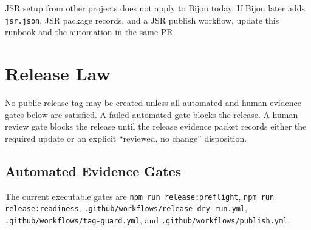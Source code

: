JSR setup from other projects does not apply to Bijou today. If Bijou later adds \texttt{j\allowbreak{}s\allowbreak{}r\allowbreak{}.\allowbreak{}j\allowbreak{}s\allowbreak{}o\allowbreak{}n}, JSR package records, and a JSR publish workflow, update this runbook and the automation in the same PR.

\section{Release Law}\label{record-274-release-law}

No public release tag may be created unless all automated and human evidence gates below are satisfied. A failed automated gate blocks the release. A human review gate blocks the release until the release evidence packet records either the required update or an explicit ``reviewed, no change'' disposition.

\subsection{Automated Evidence Gates}\label{record-274-automated-evidence-gates}

The current executable gates are \texttt{n\allowbreak{}p\allowbreak{}m\allowbreak{} \allowbreak{}r\allowbreak{}u\allowbreak{}n\allowbreak{} \allowbreak{}r\allowbreak{}e\allowbreak{}l\allowbreak{}e\allowbreak{}a\allowbreak{}s\allowbreak{}e\allowbreak{}:\allowbreak{}p\allowbreak{}r\allowbreak{}e\allowbreak{}f\allowbreak{}l\allowbreak{}i\allowbreak{}g\allowbreak{}h\allowbreak{}t}, \texttt{n\allowbreak{}p\allowbreak{}m\allowbreak{} \allowbreak{}r\allowbreak{}u\allowbreak{}n\allowbreak{} \allowbreak{}r\allowbreak{}e\allowbreak{}l\allowbreak{}e\allowbreak{}a\allowbreak{}s\allowbreak{}e\allowbreak{}:\allowbreak{}r\allowbreak{}e\allowbreak{}a\allowbreak{}d\allowbreak{}i\allowbreak{}n\allowbreak{}e\allowbreak{}s\allowbreak{}s}, \texttt{.\allowbreak{}g\allowbreak{}i\allowbreak{}t\allowbreak{}h\allowbreak{}u\allowbreak{}b\allowbreak{}/\allowbreak{}w\allowbreak{}o\allowbreak{}r\allowbreak{}k\allowbreak{}f\allowbreak{}l\allowbreak{}o\allowbreak{}w\allowbreak{}s\allowbreak{}/\allowbreak{}r\allowbreak{}e\allowbreak{}l\allowbreak{}e\allowbreak{}a\allowbreak{}s\allowbreak{}e\allowbreak{}-\allowbreak{}d\allowbreak{}r\allowbreak{}y\allowbreak{}-\allowbreak{}r\allowbreak{}u\allowbreak{}n\allowbreak{}.\allowbreak{}y\allowbreak{}m\allowbreak{}l}, \texttt{.\allowbreak{}g\allowbreak{}i\allowbreak{}t\allowbreak{}h\allowbreak{}u\allowbreak{}b\allowbreak{}/\allowbreak{}w\allowbreak{}o\allowbreak{}r\allowbreak{}k\allowbreak{}f\allowbreak{}l\allowbreak{}o\allowbreak{}w\allowbreak{}s\allowbreak{}/\allowbreak{}t\allowbreak{}a\allowbreak{}g\allowbreak{}-\allowbreak{}g\allowbreak{}u\allowbreak{}a\allowbreak{}r\allowbreak{}d\allowbreak{}.\allowbreak{}y\allowbreak{}m\allowbreak{}l}, and \texttt{.\allowbreak{}g\allowbreak{}i\allowbreak{}t\allowbreak{}h\allowbreak{}u\allowbreak{}b\allowbreak{}/\allowbreak{}w\allowbreak{}o\allowbreak{}r\allowbreak{}k\allowbreak{}f\allowbreak{}l\allowbreak{}o\allowbreak{}w\allowbreak{}s\allowbreak{}/\allowbreak{}p\allowbreak{}u\allowbreak{}b\allowbreak{}l\allowbreak{}i\allowbreak{}s\allowbreak{}h\allowbreak{}.\allowbreak{}y\allowbreak{}m\allowbreak{}l}.

